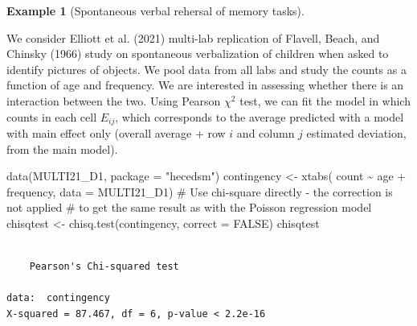 \documentclass[
  11pt,
  letterpaper,
]{scrbook}
\newenvironment{Shaded}{\begin{snugshade}}{\end{snugshade}}
\newcommand{\AttributeTok}[1]{\textcolor[rgb]{0.40,0.45,0.13}{#1}}
\newcommand{\CommentTok}[1]{\textcolor[rgb]{0.37,0.37,0.37}{#1}}
\newcommand{\ConstantTok}[1]{\textcolor[rgb]{0.56,0.35,0.01}{#1}}
\newcommand{\FunctionTok}[1]{\textcolor[rgb]{0.28,0.35,0.67}{#1}}
\newcommand{\NormalTok}[1]{\textcolor[rgb]{0.00,0.23,0.31}{#1}}
\newcommand{\OtherTok}[1]{\textcolor[rgb]{0.00,0.23,0.31}{#1}}
\newcommand{\SpecialCharTok}[1]{\textcolor[rgb]{0.37,0.37,0.37}{#1}}
\newcommand{\StringTok}[1]{\textcolor[rgb]{0.13,0.47,0.30}{#1}}
\theoremstyle{definition}
\newtheorem{example}{Example}[chapter]
\theoremstyle{definition}
\theoremstyle{remark}
\begin{document}
\begin{example}[Spontaneous verbal rehersal of memory
tasks]\protect\hypertarget{exm-elliot-contingency}{}\label{exm-elliot-contingency}

We consider Elliott et al. (2021) multi-lab replication of Flavell,
Beach, and Chinsky (1966) study on spontaneous verbalization of children
when asked to identify pictures of objects. We pool data from all labs
and study the counts as a function of age and frequency. We are
interested in assessing whether there is an interaction between the two.
Using Pearson \(\chi^2\) test, we can fit the model in which counts in
each cell \(E_{ij}\), which corresponds to the average predicted with a
model with main effect only (overall average + row \(i\) and column
\(j\) estimated deviation, from the main model).

\begin{Shaded}
\begin{Highlighting}[]
\FunctionTok{data}\NormalTok{(MULTI21\_D1, }\AttributeTok{package =} \StringTok{"hecedsm"}\NormalTok{)}
\NormalTok{contingency }\OtherTok{\textless{}{-}} \FunctionTok{xtabs}\NormalTok{(}
\NormalTok{  count }\SpecialCharTok{\textasciitilde{}}\NormalTok{ age }\SpecialCharTok{+}\NormalTok{ frequency, }
  \AttributeTok{data =}\NormalTok{ MULTI21\_D1)}
\CommentTok{\# Use chi{-}square directly {-} the correction is not applied}
\CommentTok{\# to get the same result as with the Poisson regression model}
\NormalTok{chisqtest }\OtherTok{\textless{}{-}} \FunctionTok{chisq.test}\NormalTok{(contingency, }\AttributeTok{correct =} \ConstantTok{FALSE}\NormalTok{)}
\NormalTok{chisqtest}
\end{Highlighting}
\end{Shaded}

\begin{verbatim}

    Pearson's Chi-squared test

data:  contingency
X-squared = 87.467, df = 6, p-value < 2.2e-16
\end{verbatim}

\begin{Shaded}
\end{Shaded}


\end{example}
\end{document}
